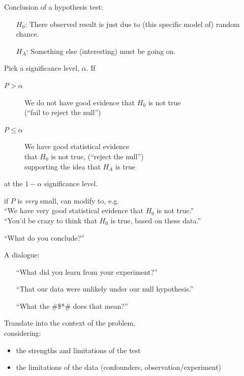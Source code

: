 \begin{frame}{Conclusion of a hypothesis test:}
    \begin{itemize}
        \item[$H_0$:] There observed result is just due to (this specific model of) random chance.
        \item[$H_A$:] Something else (interesting) must be going on.
    \end{itemize}
    \pause

    Pick a \alert{significance level}, $\alpha$.  If
    \begin{description}
        \item[$P > \alpha$] We do not have good evidence that $H_0$ is not true\\
            (``fail to reject the null'')
        \item[$P \le \alpha$] We have good statistical evidence \\
            that $H_0$ is not true,
            (``reject the null'')\\
            supporting the idea that $H_A$ is true
    \end{description}
    at the $1-\alpha$ significance level.
    \pause
    \vspace{1em}

     if $P$ is \emph{very} small,
    can modify to, e.g.\\
    ``We have very good statistical evidence that $H_0$ is not true.''\\
    \pause
    ``You'd be crazy to think that $H_0$ is true, based on these data.''

\end{frame}

\begin{frame}{``What do you conclude?''}

    A dialogue:
    \begin{itemize}
        \item[] ``What did you learn from your experiment?''
            \pause
        \item[] ``That our data were unlikely under our null hypothesis.''
            \pause
        \item[] ``What the \@\#\$*\@\# does that mean?''
    \end{itemize}
    \pause
    \vspace{2em}

    \alert{Translate} into the context of the problem,\\
    considering:
    \begin{itemize}
        \item the strengths and limitations of the test
        \item the limitations of the data (confounders, observation/experiment)
    \end{itemize}


\end{frame}


